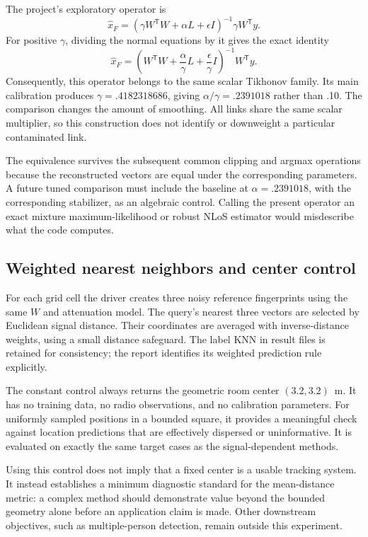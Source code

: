 \documentclass[conference,letterpaper]{IEEEtran}
\newcommand{\T}{^{\mathsf T}}
\begin{document}
The project's exploratory operator is
\begin{equation}
\widehat x_F=(\gamma W\T W+\alpha L+\epsilon I)^{-1}\gamma W\T y.
\label{eq:fisheroperator}
\end{equation}
For positive $\gamma$, dividing the normal equations by it gives the exact identity
\begin{equation}
\widehat x_F=\left(W\T W+\frac{\alpha}{\gamma}L+
\frac{\epsilon}{\gamma}I\right)^{-1}W\T y.
\label{eq:equivalence}
\end{equation}
Consequently, this operator belongs to the same scalar Tikhonov family. Its main calibration produces $\gamma=.4182318686$, giving $\alpha/\gamma=.2391018$ rather than .10. The comparison changes the amount of smoothing. All links share the same scalar multiplier, so this construction does not identify or downweight a particular contaminated link.

The equivalence survives the subsequent common clipping and argmax operations because the reconstructed vectors are equal under the corresponding parameters. A future tuned comparison must include the baseline at $\alpha=.2391018$, with the corresponding stabilizer, as an algebraic control. Calling the present operator an exact mixture maximum-likelihood or robust NLoS estimator would misdescribe what the code computes.

\subsection{Weighted nearest neighbors and center control}
For each grid cell the driver creates three noisy reference fingerprints using the same $W$ and attenuation model. The query's nearest three vectors are selected by Euclidean signal distance. Their coordinates are averaged with inverse-distance weights, using a small distance safeguard. The label KNN in result files is retained for consistency; the report identifies its weighted prediction rule explicitly.

The constant control always returns the geometric room center $(3.2,3.2)$~m. It has no training data, no radio observations, and no calibration parameters. For uniformly sampled positions in a bounded square, it provides a meaningful check against location predictions that are effectively dispersed or uninformative. It is evaluated on exactly the same target cases as the signal-dependent methods.

Using this control does not imply that a fixed center is a usable tracking system. It instead establishes a minimum diagnostic standard for the mean-distance metric: a complex method should demonstrate value beyond the bounded geometry alone before an application claim is made. Other downstream objectives, such as multiple-person detection, remain outside this experiment.
\end{document}
